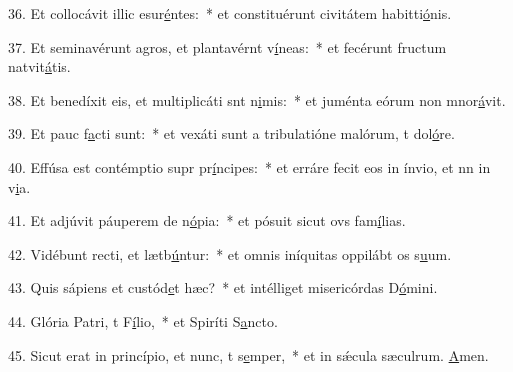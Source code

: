 36. Et collocávit illic esur\uline{é}ntes:~* et constituérunt civitátem habitti\uline{ó}nis.\par 
37. Et seminavérunt agros, et plantavérnt v\uline{í}neas:~* et fecérunt fructum natvit\uline{á}tis.\par 
38. Et benedíxit eis, et multiplicáti snt n\uline{i}mis:~* et juménta eórum non mnor\uline{á}vit.\par 
39. Et pauc f\uline{a}cti sunt:~* et vexáti sunt a tribulatióne malórum, t dol\uline{ó}re.\par 
40. Effúsa est contémptio supr pr\uline{í}ncipes:~* et erráre fecit eos in ínvio, et nn in v\uline{i}a.\par 
41. Et adjúvit páuperem de n\uline{ó}pia:~* et pósuit sicut ovs fam\uline{í}lias.\par 
42. Vidébunt recti, et lætb\uline{ú}ntur:~* et omnis iníquitas oppilábt os s\uline{u}um.\par 
43. Quis sápiens et custód\uline{e}t hæc?~* et intélliget misericórdas D\uline{ó}mini.\par 
44. Glória Patri, t F\uline{í}lio,~* et Spiríti S\uline{a}ncto.\par 
45. Sicut erat in princípio, et nunc, t s\uline{e}mper,~* et in sǽcula sæculrum. \uline{A}men.\par 
